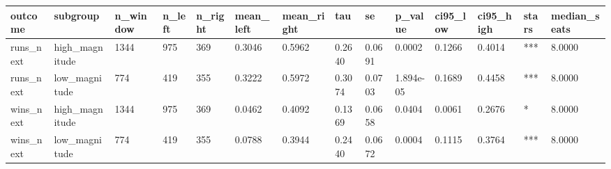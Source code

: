 \begin{tabular}{llllllllllllll}
\toprule
outcome & subgroup & n\_window & n\_left & n\_right & mean\_left & mean\_right & tau & se & p\_value & ci95\_low & ci95\_high & stars & median\_seats \\
\midrule
runs\_next & high\_magnitude & 1344 & 975 & 369 & 0.3046 & 0.5962 & 0.2640 & 0.0691 & 0.0002 & 0.1266 & 0.4014 & *** & 8.0000 \\
runs\_next & low\_magnitude & 774 & 419 & 355 & 0.3222 & 0.5972 & 0.3074 & 0.0703 & 1.894e-05 & 0.1689 & 0.4458 & *** & 8.0000 \\
wins\_next & high\_magnitude & 1344 & 975 & 369 & 0.0462 & 0.4092 & 0.1369 & 0.0658 & 0.0404 & 0.0061 & 0.2676 & * & 8.0000 \\
wins\_next & low\_magnitude & 774 & 419 & 355 & 0.0788 & 0.3944 & 0.2440 & 0.0672 & 0.0004 & 0.1115 & 0.3764 & *** & 8.0000 \\
\bottomrule
\end{tabular}
